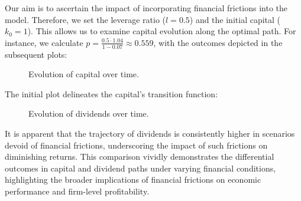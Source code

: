 \documentclass[12pt]{report}
\begin{document}
Our aim is to ascertain the impact of incorporating financial frictions into the model. Therefore, we set the leverage
ratio (\(l=0.5\))  and the initial capital (\(k_0=1\)). This allows us to examine capital evolution along the optimal
path. For instance, we calculate \(p=\frac{0.5 \cdot 1.04}{1-0.07} \approx 0.559\), with the outcomes depicted in the
subsequent plots:

\begin{figure}[H]
    \centering
    \caption{Evolution of capital over time.}
    \label{fig:capitalEvolution}
\end{figure}

The initial plot delineates the capital's transition function:

\begin{figure}[H]
    \centering
    \caption{Evolution of dividends over time.}
    \label{fig:dividendsEvolution}
\end{figure}

It is apparent that the trajectory of dividends is consistently higher in scenarios devoid of financial frictions,
underscoring the impact of such frictions on diminishing returns. This comparison vividly demonstrates the differential
outcomes in capital and dividend paths under varying financial conditions, highlighting the broader implications of
financial frictions on economic performance and firm-level profitability. 
\end{document}
